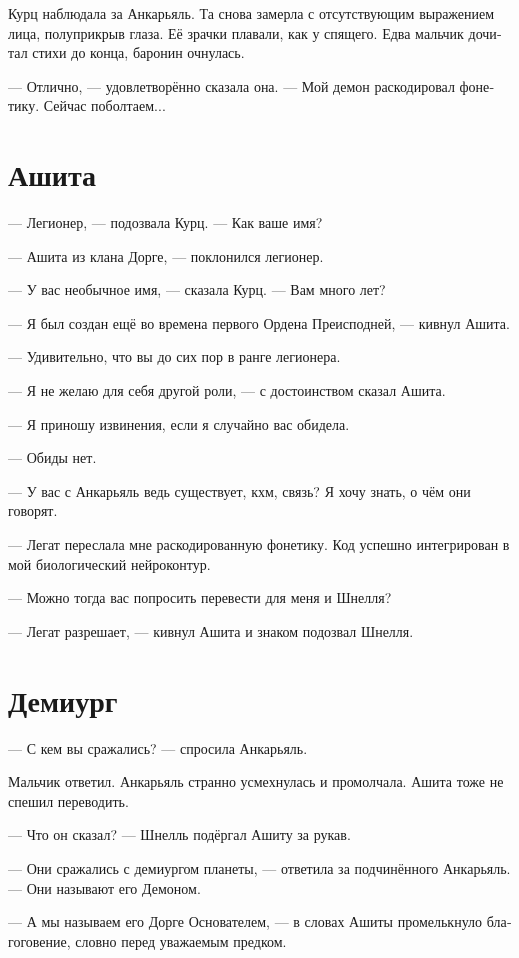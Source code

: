 \documentclass[a4paper,10pt,fleqn]{book}\usepackage{polyglossia}\setdefaultlanguage[babelshorthands=true]{russian}\setotherlanguage{english}\defaultfontfeatures{Ligatures=TeX,Mapping=tex-text}\usepackage{xcolor}\newcommand{\ml}[3]{#2}
\begin{document}
Курц наблюдала за Анкарьяль.
Та снова замерла с отсутствующим выражением лица, полуприкрыв глаза.
Её зрачки плавали, как у спящего.
Едва мальчик дочитал стихи до конца, баронин очнулась.

--- Отлично, --- удовлетворённо сказала она.
--- Мой демон раскодировал фонетику.
Сейчас поболтаем...

\section{Ашита}

--- Легионер, --- подозвала Курц.
--- Как ваше имя?

--- Ашита из клана Дорге, --- поклонился легионер.

--- У вас необычное имя, --- сказала Курц.
--- Вам много лет?

--- Я был создан ещё во времена первого Ордена Преисподней, --- кивнул Ашита.

--- Удивительно, что вы до сих пор в ранге легионера.

--- Я не желаю для себя другой роли, --- с достоинством сказал Ашита.

--- Я приношу извинения, если я случайно вас обидела.

--- Обиды нет.

--- У вас с Анкарьяль ведь существует, кхм, связь?
Я хочу знать, о чём они говорят.

--- Легат переслала мне раскодированную фонетику.
Код успешно интегрирован в мой биологический нейроконтур.

--- Можно тогда вас попросить перевести для меня и Шнелля?

--- Легат разрешает, --- кивнул Ашита и знаком подозвал Шнелля.

\section{Демиург}

--- С кем вы сражались? --- спросила Анкарьяль.

Мальчик ответил.
Анкарьяль странно усмехнулась и промолчала.
Ашита тоже не спешил переводить.

--- Что он сказал? --- Шнелль подёргал Ашиту за рукав.

--- Они сражались с демиургом планеты, --- ответила за подчинённого Анкарьяль.
--- Они называют его Демоном.

--- А мы называем его Дорге Основателем, --- в словах Ашиты промелькнуло благоговение, словно перед уважаемым предком.
\end{document}
